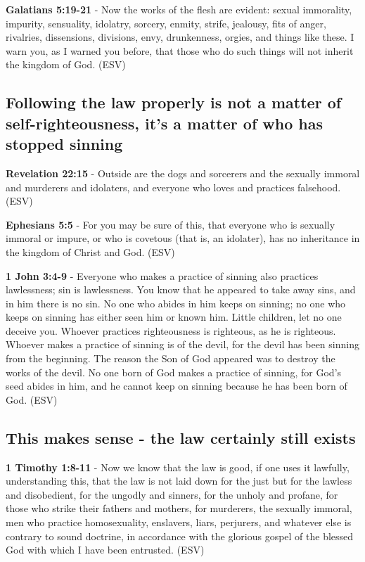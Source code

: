 \documentclass[11pt]{article}
\begin{document}
\textbf{Galatians 5:19-21} -  Now the works of the flesh are evident: sexual immorality, impurity, sensuality, idolatry, sorcery, enmity, strife, jealousy, fits of anger, rivalries, dissensions, divisions, envy, drunkenness, orgies, and things like these.  I warn you, as I warned you before, that those who do such things will not inherit the kingdom of God.  (ESV)

\subsection{Following the law properly is not a matter of self-righteousness, it's a matter of who has stopped sinning}
\label{sec:orgd4f04b0}

\textbf{Revelation 22:15} -  Outside are the dogs and sorcerers and the sexually immoral and murderers and idolaters, and everyone who loves and practices falsehood.  (ESV)

\textbf{Ephesians 5:5} -  For you may be sure of this, that everyone who is sexually immoral or impure, or who is covetous (that is, an idolater), has no inheritance in the kingdom of Christ and God.  (ESV)

\textbf{1 John 3:4-9} -  Everyone who makes a practice of sinning also practices lawlessness; sin is lawlessness.  You know that he appeared to take away sins, and in him there is no sin.  No one who abides in him keeps on sinning; no one who keeps on sinning has either seen him or known him.  Little children, let no one deceive you.  Whoever practices righteousness is righteous, as he is righteous.  Whoever makes a practice of sinning is of the devil, for the devil has been sinning from the beginning.  The reason the Son of God appeared was to destroy the works of the devil.  No one born of God makes a practice of sinning, for God's seed abides in him, and he cannot keep on sinning because he has been born of God.  (ESV)

\subsection{This makes sense - the law certainly still exists}
\label{sec:org60bbc6a}
\textbf{1 Timothy 1:8-11} -  Now we know that the law is good, if one uses it lawfully, understanding this, that the law is not laid down for the just but for the lawless and disobedient, for the ungodly and sinners, for the unholy and profane, for those who strike their fathers and mothers, for murderers, the sexually immoral, men who practice homosexuality, enslavers, liars, perjurers, and whatever else is contrary to sound doctrine, in accordance with the glorious gospel of the blessed God with which I have been entrusted.  (ESV)
\end{document}
